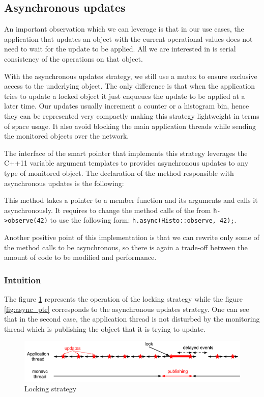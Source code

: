 \subsection*{Asynchronous updates}

An important observation which we can leverage is that in our use cases, the application that updates an object with the current operational values does not need to wait for the update to be applied. All we are interested in is serial consistency of the operations on that object. 

With the asynchronous updates strategy, we still use a mutex to ensure exclusive access to the underlying object. The only difference is that when the application tries to update a locked object it just enqueues the update to be applied at a later time. Our updates usually increment a counter or a histogram bin, hence they can be represented very compactly making this strategy lightweight in terms of space usage. It also avoid blocking the main application threads while sending the monitored objects over the network.

The interface of the smart pointer that implements this strategy leverages the C++11 variable argument templates to provides asynchronous updates to any type of monitored object. The declaration of the method responsible with asynchronous updates is the following:


This method takes a pointer to a member function and its arguments and calls it asynchronously. It requires to change the method calls of the from \verb+h->observe(42)+ to use the following form: \verb+h.async(Histo::observe, 42);+.

Another positive point of this implementation is that we can rewrite only some of the method calls to be asynchronous, so there is again a trade-off between the amount of code to be modified and performance.

\subsubsection*{Intuition}

The figure \ref{fig:sync_ptr} represents the operation of the locking strategy while the figure \ref{fig:async_ptr} corresponds to the asynchronous updates strategy. One can see that in the second case, the application thread is not disturbed by the monitoring thread which is publishing the object that it is trying to update.
\begin{figure}[ht!]
\centering
\includegraphics[scale=0.6]{Images/async_before.png}
\caption{Locking strategy}
\label{fig:sync_ptr}
\end{figure}

